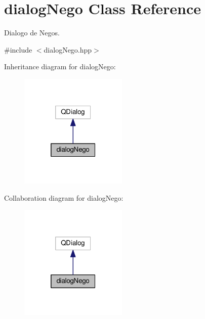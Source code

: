 \hypertarget{classdialogNego}{}\section{dialog\+Nego Class Reference}
\label{classdialogNego}


Dialogo de Negos.  




{\ttfamily \#include $<$dialog\+Nego.\+hpp$>$}



Inheritance diagram for dialog\+Nego\+:
\nopagebreak
\begin{figure}[H]
\begin{center}
\leavevmode
\includegraphics[width=145pt]{classdialogNego__inherit__graph}
\end{center}
\end{figure}


Collaboration diagram for dialog\+Nego\+:
\nopagebreak
\begin{figure}[H]
\begin{center}
\leavevmode
\includegraphics[width=145pt]{classdialogNego__coll__graph}
\end{center}
\end{figure}
